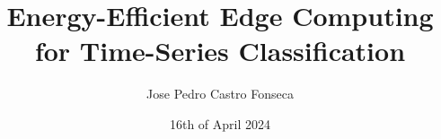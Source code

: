 \documentclass[]{iisreport}
\title{Energy-Efficient Edge Computing for Time-Series Classification}
\author{Jose Pedro Castro Fonseca}
\date{16th of April 2024}
\begin{document}
\frontmatter





\tableofcontents

\mainmatter



%




\appendix

%

\backmatter


\listofacronyms

\listoffigures
\listoftables


\end{document}
